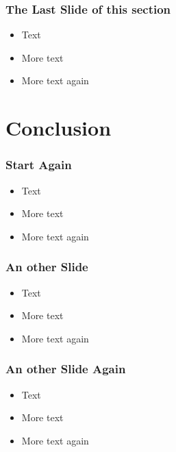 \begin{frame} 
\frametitle{The Last Slide of this section}
  \begin{itemize}
  \item Text
  \item More text
  \item More text again
  \end{itemize}
\end{frame}

\section{Conclusion}

\begin{frame} 
\frametitle{Start Again}
  \begin{itemize}
  \item Text
  \item More text
  \item More text again
  \end{itemize}
\end{frame}


\begin{frame} 
\frametitle{An other Slide}
  \begin{itemize}
  \item Text
  \item More text
  \item More text again
  \end{itemize}
\end{frame}


\begin{frame} 
\frametitle{An other Slide Again}
  \begin{itemize}
  \item Text
  \item More text
  \item More text again
  \end{itemize}
\end{frame}


